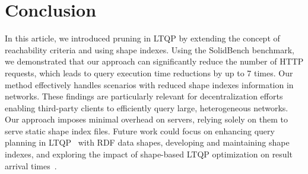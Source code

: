 \section{Conclusion}

In this article, we introduced pruning in LTQP by extending the concept of reachability criteria and using shape indexes.
Using the SolidBench benchmark, we demonstrated that our approach can significantly reduce the number of HTTP requests, which leads to query execution time reductions by up to 7 times.
Our method effectively handles scenarios with reduced shape indexes information in networks.
These findings are  particularly relevant for decentralization efforts enabling third-party clients to efficiently query large, heterogeneous networks.
Our approach imposes minimal overhead on servers, relying solely on them to serve static shape index files.
Future work could focus on enhancing query planning in LTQP~\cite{taelman2024towards} with RDF data shapes, developing and maintaining shape indexes, and exploring the impact of shape-based LTQP optimization on result arrival times~\cite{Acosta2017}.

